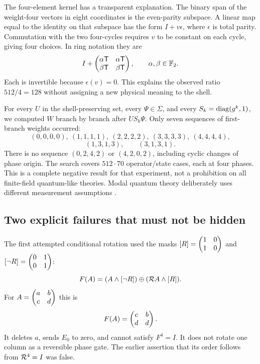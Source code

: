 The four-element kernel has a transparent explanation. The binary span of the weight-four vectors in eight coordinates is the even-parity subspace. A linear map equal to the identity on that subspace has the form $I+v\epsilon$, where $\epsilon$ is total parity. Commutation with the two four-cycles requires $v$ to be constant on each cycle, giving four choices. In ring notation they are
\begin{equation}
 I+\begin{pmatrix}\alpha\mathsf T&\alpha\mathsf T\\\beta\mathsf T&\beta\mathsf T\end{pmatrix},
 \qquad \alpha,\beta\in\mathbb F_2.
\end{equation}
Each is invertible because $\epsilon(v)=0$. This explains the observed ratio $512/4=128$ without assigning a new physical meaning to the shell.

For every $U$ in the shell-preserving set, every $\Psi\in\Sigma$, and every $S_k=\operatorname{diag}(g^k,1)$, we computed $W$ branch by branch after $US_k\Psi$. Only seven sequences of first-branch weights occurred:
\begin{equation}
 (0,0,0,0),\ (1,1,1,1),\ (2,2,2,2),\ (3,3,3,3),\ (4,4,4,4),
\end{equation}
\begin{equation}
 (1,3,1,3),\qquad (3,1,3,1).
\end{equation}
There is no sequence $(0,2,4,2)$ or $(4,2,0,2)$, including cyclic changes of phase origin. The search covers $512\cdot70$ operator/state cases, each at four phases. This is a complete negative result for that experiment, not a prohibition on all finite-field quantum-like theories. Modal quantum theory deliberately uses different measurement assumptions \cite{modal}.

\subsection{Two explicit failures that must not be hidden}
The first attempted conditional rotation used the masks $[R]=\begin{pmatrix}1&0\\1&0\end{pmatrix}$ and $[\neg R]=\begin{pmatrix}0&1\\0&1\end{pmatrix}$:
\begin{equation}
 F(A)=(A\land[\neg R])\oplus(\mathcal R A\land[R]).
\end{equation}
For $A=\begin{pmatrix}a&b\\c&d\end{pmatrix}$ this is
\begin{equation}\label{eq:badmask}
 F(A)=\begin{pmatrix}c&b\\d&d\end{pmatrix}.
\end{equation}
It deletes $a$, sends $E_0$ to zero, and cannot satisfy $F^4=I$. It does not rotate one column as a reversible phase gate. The earlier assertion that its order follows from $\mathcal R^4=I$ was false.

